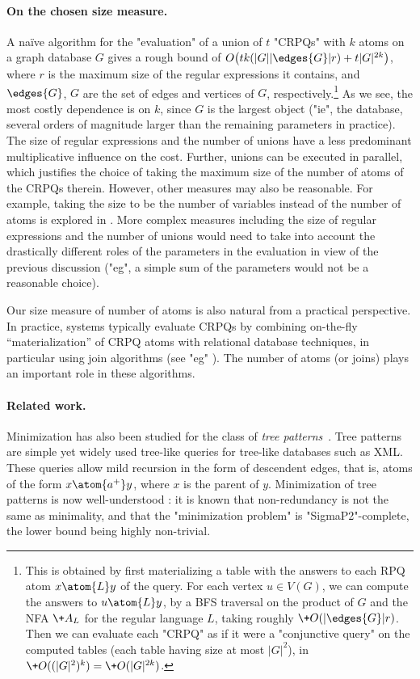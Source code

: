 \paragraph{On the chosen size measure.}
A naïve algorithm for the "evaluation" of a union of $t$ "CRPQs" with $k$ atoms on a graph database $G$ gives a rough bound of $O\big(t  k  (|G||\edges{G}| r) + t  |G|^{2k}\big)$, where $r$ is the maximum size of the regular expressions it contains, and $\edges{G}$, $G$ are the set of edges and vertices of $G$, respectively.\footnote[][-10em]{This is obtained by first materializing a table with the answers to each RPQ atom $x \atom{L} y$ of the query. For each vertex $u\in V(G)$, we can compute the answers to $u \atom{L} y$, by a BFS traversal on the product of $G$ and   the NFA $\+A_L$ for the regular language $L$, taking roughly $\+O(|\edges{G}| r)$. Then we can evaluate each "CRPQ" as if it were a "conjunctive query" on the computed tables (each table having size at most $|G|^2$), in $\+O((|G|^2)^k) = \+O(|G|^{2k})$.}
As we see, the most costly dependence is on $k$, since $G$ is the largest object ("ie", the database, several orders of magnitude larger than the remaining parameters in practice). The size of regular expressions and the number of unions have a less predominant multiplicative influence on the cost.
Further, unions can be executed in parallel, which justifies the choice of taking the maximum size of the number of atoms of the CRPQs therein.
However, other measures may also be reasonable. For example, taking the size to be the number of variables instead of the number of atoms is explored in .
More complex measures including the size of regular expressions and the number of unions would need to take into account the drastically different roles of the parameters in the evaluation in view of the previous discussion ("eg", a simple sum of the parameters would not be a reasonable choice).

Our size measure of number of atoms is also natural from a practical perspective. In practice, systems typically evaluate CRPQs by combining   on-the-fly ``materialization'' of CRPQ atoms  with  relational database techniques, in particular using join algorithms (see "eg" \cite{VrgocEtal2024MillenniumDB,KaralisBigerlHeidrichSherifNgongaNgomo2024Efficient,CucumidesReutterVrgoc2024SizeBounds}).  The number of atoms (or joins) plays an important role in these algorithms.
	
\paragraph{Related work.}
Minimization has also been studied for the class of \emph{tree patterns}~\cite{FlescaFurfaroMasciari2008Minimization,KimelfeldSagiv2008Revisiting,CzerwinskiMartensNiewerthParys2018Minimization}. Tree patterns are simple yet widely used tree-like queries for tree-like databases such as XML. These queries allow mild recursion in the form of descendent edges, that is, atoms of the form $x \atom{a^+} y$, where $x$ is the parent of $y$. 
Minimization of tree patterns is now well-understood \cite{CzerwinskiMartensNiewerthParys2018Minimization}: it is known that non-redundancy is not the same as minimality, and that the "minimization problem" is "SigmaP2"-complete, the lower bound being highly non-trivial.